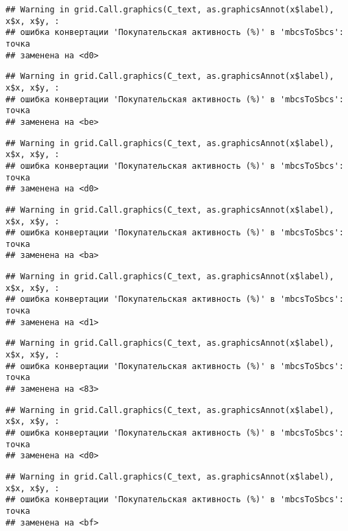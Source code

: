 \documentclass[
]{article}
\begin{document}
\begin{verbatim}
## Warning in grid.Call.graphics(C_text, as.graphicsAnnot(x$label), x$x, x$y, :
## ошибка конвертации 'Покупательская активность (%)' в 'mbcsToSbcs': точка
## заменена на <d0>
\end{verbatim}

\begin{verbatim}
## Warning in grid.Call.graphics(C_text, as.graphicsAnnot(x$label), x$x, x$y, :
## ошибка конвертации 'Покупательская активность (%)' в 'mbcsToSbcs': точка
## заменена на <be>
\end{verbatim}

\begin{verbatim}
## Warning in grid.Call.graphics(C_text, as.graphicsAnnot(x$label), x$x, x$y, :
## ошибка конвертации 'Покупательская активность (%)' в 'mbcsToSbcs': точка
## заменена на <d0>
\end{verbatim}

\begin{verbatim}
## Warning in grid.Call.graphics(C_text, as.graphicsAnnot(x$label), x$x, x$y, :
## ошибка конвертации 'Покупательская активность (%)' в 'mbcsToSbcs': точка
## заменена на <ba>
\end{verbatim}

\begin{verbatim}
## Warning in grid.Call.graphics(C_text, as.graphicsAnnot(x$label), x$x, x$y, :
## ошибка конвертации 'Покупательская активность (%)' в 'mbcsToSbcs': точка
## заменена на <d1>
\end{verbatim}

\begin{verbatim}
## Warning in grid.Call.graphics(C_text, as.graphicsAnnot(x$label), x$x, x$y, :
## ошибка конвертации 'Покупательская активность (%)' в 'mbcsToSbcs': точка
## заменена на <83>
\end{verbatim}

\begin{verbatim}
## Warning in grid.Call.graphics(C_text, as.graphicsAnnot(x$label), x$x, x$y, :
## ошибка конвертации 'Покупательская активность (%)' в 'mbcsToSbcs': точка
## заменена на <d0>
\end{verbatim}

\begin{verbatim}
## Warning in grid.Call.graphics(C_text, as.graphicsAnnot(x$label), x$x, x$y, :
## ошибка конвертации 'Покупательская активность (%)' в 'mbcsToSbcs': точка
## заменена на <bf>
\end{verbatim}
\end{document}
